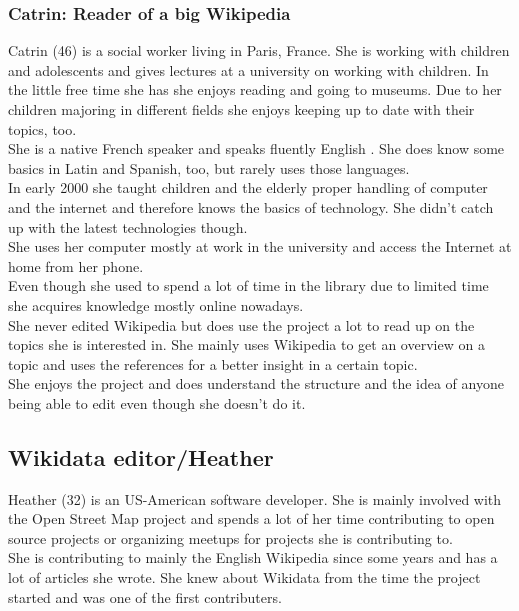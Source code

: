 \documentclass[11pt]{article}
\begin{document}
\subsubsection{Catrin: Reader of a big Wikipedia}
Catrin (46) is a social worker living in Paris, France. She is working with children and adolescents and gives lectures at a university on working with children. In the little free time she has she enjoys reading and going to museums. Due to her children majoring in different fields she enjoys keeping up to date with their topics, too. \\
She is a native French speaker and speaks fluently English . She does know some basics in Latin and Spanish, too, but rarely uses those languages. \\
In early 2000 she taught children and the elderly proper handling of computer and the internet and therefore knows the basics of technology. She didn't catch up with the latest technologies though. \\
She uses her computer mostly at work in the university and access the Internet at home from her phone. \\
Even though she used to spend a lot of time in the library due to limited time she acquires knowledge mostly online nowadays. \\
She never edited Wikipedia but does use the project a lot to read up on the topics she is interested in. She mainly uses Wikipedia to get an overview on a topic and uses the references for a better insight in a certain topic. \\
She enjoys the project and does understand the structure and the idea of anyone being able to edit even though she doesn't do it. \\


\subsection{Wikidata editor/Heather}
Heather (32) is an US-American software developer. She is mainly involved with the Open Street Map project and spends a lot of her time contributing to open source projects or organizing meetups for projects she is contributing to. \\
She is contributing to mainly the English Wikipedia since some years and has a lot of articles she wrote. 
She knew about Wikidata from the time the project started and was one of the first contributers. 
\end{document}
